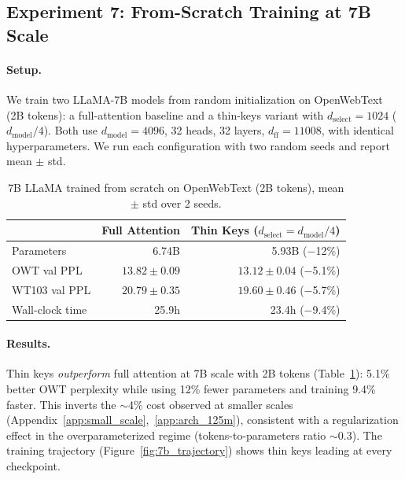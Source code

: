 \documentclass{article} %
\newcommand{\dmodel}{d_{\text{model}}}
\newcommand{\dselect}{d_{\text{select}}}
\begin{document}
\subsection{Experiment 7: From-Scratch Training at 7B Scale}

\paragraph{Setup.}
We train two LLaMA-7B models from random initialization on OpenWebText (2B tokens): a full-attention baseline and a thin-keys variant with $\dselect = 1024$ ($\dmodel/4$). Both use $\dmodel = 4096$, 32 heads, 32 layers, $d_{\text{ff}} = 11008$, with identical hyperparameters. We run each configuration with two random seeds and report mean $\pm$ std.

\begin{table}[h]
\centering
\caption{7B LLaMA trained from scratch on OpenWebText (2B tokens), mean $\pm$ std over 2 seeds.}
\label{tab:7b_scratch}
\begin{tabular}{lrr}
\toprule
 & Full Attention & Thin Keys ($\dselect = \dmodel/4$) \\
\midrule
Parameters & 6.74B & 5.93B ($-$12\%) \\
OWT val PPL & $13.82 \pm 0.09$ & $\mathbf{13.12 \pm 0.04}$ ($-$5.1\%) \\
WT103 val PPL & $20.79 \pm 0.35$ & $\mathbf{19.60 \pm 0.46}$ ($-$5.7\%) \\
Wall-clock time & 25.9h & 23.4h ($-$9.4\%) \\
\bottomrule
\end{tabular}
\end{table}

\paragraph{Results.}
Thin keys \emph{outperform} full attention at 7B scale with 2B tokens (Table~\ref{tab:7b_scratch}): 5.1\% better OWT perplexity while using 12\% fewer parameters and training 9.4\% faster. This inverts the $\sim$4\% cost observed at smaller scales (Appendix~\ref{app:small_scale},~\ref{app:arch_125m}), consistent with a regularization effect in the overparameterized regime (tokens-to-parameters ratio $\sim$0.3). The training trajectory (Figure~\ref{fig:7b_trajectory}) shows thin keys leading at every checkpoint.
\end{document}
